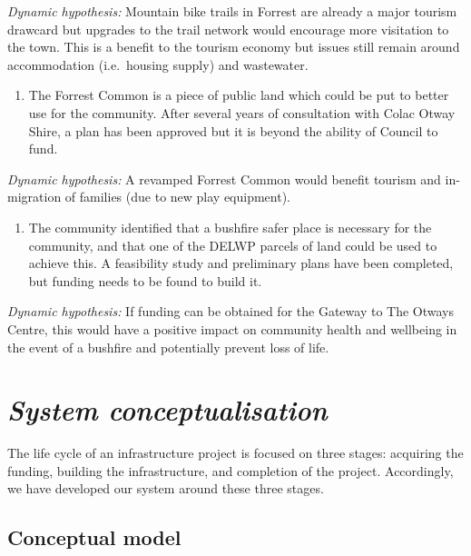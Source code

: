 \documentclass[
  11pt,
]{book}
\providecommand{\tightlist}{%
  \setlength{\itemsep}{0pt}\setlength{\parskip}{0pt}}
\begin{document}
\emph{Dynamic hypothesis:}
Mountain bike trails in Forrest are already a major tourism drawcard but upgrades to the trail network would encourage more visitation to the town. This is a benefit to the tourism economy but issues still remain around accommodation (i.e.~housing supply) and wastewater.

\begin{enumerate}
\def\labelenumi{\arabic{enumi}.}
\setcounter{enumi}{2}
\tightlist
\item
  The Forrest Common is a piece of public land which could be put to better use for the community. After several years of consultation with Colac Otway Shire, a plan has been approved but it is beyond the ability of Council to fund.
\end{enumerate}

\emph{Dynamic hypothesis:}
A revamped Forrest Common would benefit tourism and in-migration of families (due to new play equipment).

\begin{enumerate}
\def\labelenumi{\arabic{enumi}.}
\setcounter{enumi}{3}
\tightlist
\item
  The community identified that a bushfire safer place is necessary for the community, and that one of the DELWP parcels of land could be used to achieve this. A feasibility study and preliminary plans have been completed, but funding needs to be found to build it.
\end{enumerate}

\emph{Dynamic hypothesis:}
If funding can be obtained for the Gateway to The Otways Centre, this would have a positive impact on community health and wellbeing in the event of a bushfire and potentially prevent loss of life.

\hypertarget{system-conceptualisation-6}{%
\section{\texorpdfstring{\emph{System conceptualisation}}{System conceptualisation}}\label{system-conceptualisation-6}}

The life cycle of an infrastructure project is focused on three stages: acquiring the funding, building the infrastructure, and completion of the project. Accordingly, we have developed our system around these three stages.

\hypertarget{conceptual-model-8}{%
\subsection{Conceptual model}\label{conceptual-model-8}}
\end{document}
